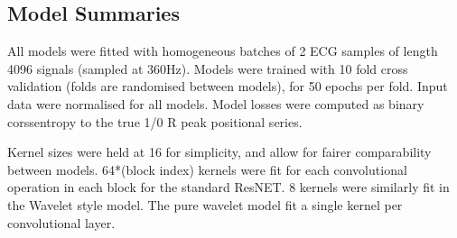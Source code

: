 \documentclass[9pt,conference]{IEEEtran}
\begin{document}
\clearpage

\subsection{Model Summaries}

All models were fitted with homogeneous batches of 2 ECG samples of length 4096 signals (sampled at 360Hz). Models were trained with 10 fold cross validation (folds are randomised between models), for 50 epochs per fold. Input data were normalised for all models. Model losses were computed as binary corssentropy to the true 1/0 R peak positional series.

Kernel sizes were held at 16 for simplicity, and allow for fairer comparability between models. 64*(block index) kernels were fit for each convolutional operation in each block for the standard ResNET. 8 kernels were similarly fit in the Wavelet style model. The pure wavelet model fit a single kernel per convolutional layer. 
\end{document}
